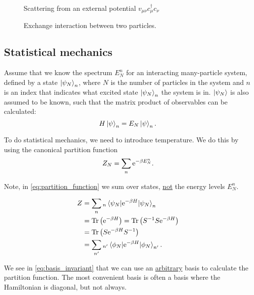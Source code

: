 \begin{figure}
\centering

\caption{Scattering from an external potential $v_{\mu\nu}c_{\mu}^\dagger c_{\nu}$}
\end{figure}


\begin{figure}
\centering

\caption{Exchange interaction between two particles.}
\end{figure}


\subsection{Statistical mechanics}

Assume that we know the spectrum $E_N^n$ for an interacting many-particle system, defined by a state $\ket{\psi_N}_n$, where $N$ is the number of particles in the system and $n$ is an index that indicates what excited state $\ket{\psi_N}_n$ the system is in. 
$\ket{\psi_N}$ is also assumed to be known, such that the matrix product of observables can be calculated: 
\begin{equation}
H\ket{\psi}_n = E_N\ket{\psi}_n.
\end{equation}

To do statistical mechanics, we need to introduce temperature. We do this by using the canonical partition function
\begin{equation}
\label{eq:partition_function}
Z_N = \sum_n\mathrm{e}^{-\beta E_N^n}.
\end{equation}

Note, in \eqref{eq:partition_function} we sum over states, \underline{not} the energy levels $E_N^n$.

\begin{align}
Z &= \sum_n {}_n\mel{\psi_N}{\mathrm{e}^{-\beta H}}{\psi_N}_n \nonumber \\
 &= \Tr\left(\mathrm{e}^{-\beta H}\right) = \Tr\left(S^{-1}S\mathrm{e}^{-\beta H}\right) \nonumber\\
 &= \Tr\left(S\mathrm{e}^{-\beta H}S^{-1}\right) \nonumber \\
 &= \sum_{n'}{}_{n'}\mel{\phi_N}{\mathrm{e}^{-\beta H}}{\phi_N}_{n'}. \label{eq:basis_invariant}
\end{align}

We see in \eqref{eq:basis_invariant} that we can use an \underline{arbitrary} basis to calculate the partition function. The most convenient basis is often a basis where the Hamiltonian is diagonal, but not always.

